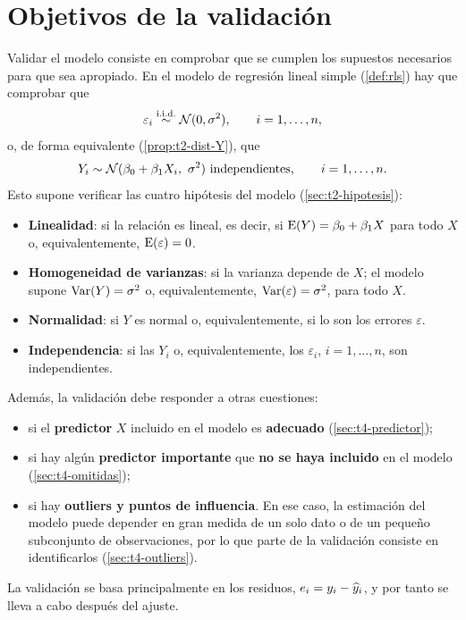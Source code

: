 \section{Objetivos de la validación}
\label{sec:t4-objetivos}

Validar el modelo consiste en comprobar que se cumplen los supuestos necesarios para que sea
apropiado. En el modelo de regresión lineal simple (\cref{def:rls}) hay que comprobar que
\[
  \varepsilon_i \overset{\text{i.i.d.}}{\sim} \mathcal{N}(0,\sigma^2), \qquad i=1,\ldots,n,
\]
o, de forma equivalente (\cref{prop:t2-dist-Y}), que
\[
  Y_i \sim \Normal(\beta_0+\beta_1X_i,\ \sigma^2) \ \text{independientes}, \qquad i=1,\ldots,n .
\]
Esto supone verificar las cuatro hipótesis del modelo (\cref{sec:t2-hipotesis}):
\begin{itemize}
  \item \textbf{Linealidad}: si la relación es lineal, es decir, si $\operatorname{E}(Y)=\beta_0+\beta_1X$
    para todo $X$ o, equivalentemente, $\operatorname{E}(\varepsilon)=0$.
  \item \textbf{Homogeneidad de varianzas}: si la varianza depende de $X$; el modelo supone
    $\operatorname{Var}(Y)=\sigma^2$ o, equivalentemente, $\operatorname{Var}(\varepsilon)=\sigma^2$, para todo $X$.
  \item \textbf{Normalidad}: si $Y$ es normal o, equivalentemente, si lo son los errores
    $\varepsilon$.
  \item \textbf{Independencia}: si las $Y_i$ o, equivalentemente, los $\varepsilon_i$,
    $i=1,\ldots,n$, son independientes.
\end{itemize}

Además, la validación debe responder a otras cuestiones:
\begin{itemize}
  \item si el \textbf{predictor} $X$ incluido en el modelo es \textbf{adecuado}
    (\cref{sec:t4-predictor});
  \item si hay algún \textbf{predictor importante} que \textbf{no se haya incluido} en el
    modelo (\cref{sec:t4-omitidas});
  \item si hay \textbf{outliers y puntos de influencia}. En ese caso, la estimación del modelo
    puede depender en gran medida de un solo dato o de un pequeño subconjunto de
    observaciones, por lo que parte de la validación consiste en identificarlos
    (\cref{sec:t4-outliers}).
\end{itemize}

La validación se basa principalmente en los residuos, $e_i=y_i-\widehat{y}_i$, y por tanto se lleva a
cabo después del ajuste.
